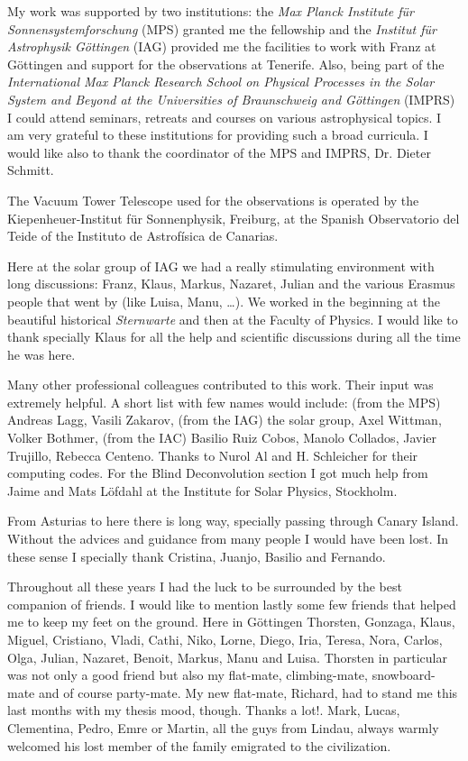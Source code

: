My work was supported by two institutions: the \emph{Max Planck Institute f\"ur Sonnensystemforschung} (MPS) granted me the fellowship and the \emph{Institut f\"ur Astrophysik G\"ottingen} (IAG) provided me the facilities to work with Franz at G\"ottingen and support for the observations at Tenerife. Also, being part of the \emph{International Max Planck Research School on Physical Processes in the Solar System and Beyond at the Universities of Braunschweig and G\"ottingen} (IMPRS) I could attend seminars, retreats and courses on various astrophysical topics. I am very grateful to these institutions for providing such a broad curricula. I would like also to thank the coordinator of the MPS and IMPRS, Dr. Dieter Schmitt. 

The Vacuum Tower Telescope used for the observations is operated by the Kiepenheuer-Institut f\"ur Sonnenphysik, Freiburg, at the Spanish Observatorio del Teide of the Instituto de Astrof\'isica de Canarias.  

Here at the solar group of IAG we had a really stimulating environment with long discussions: Franz, Klaus, Markus, Nazaret, Julian and the various Erasmus people that went by (like Luisa, Manu, \dots ). We worked in the beginning at the beautiful historical \emph{Sternwarte} and then at the Faculty of Physics. I would like to thank specially Klaus for all the help and scientific discussions during all the time he was here.

Many other professional colleagues contributed to this work. Their input was extremely helpful. A short list with few names would include: (from the MPS) Andreas Lagg, Vasili Zakarov, (from the IAG) the solar group, Axel Wittman, Volker Bothmer, (from the IAC) Basilio Ruiz Cobos, Manolo Collados, Javier Trujillo, Rebecca Centeno. Thanks to Nurol Al and H. Schleicher for their computing codes. For the Blind Deconvolution section I got much help from Jaime and Mats L\"ofdahl at the Institute for Solar Physics, Stockholm.

From Asturias to here there is long way, specially passing through Canary Island. Without the advices and guidance from many people I would have been lost. In these sense I specially thank Cristina, Juanjo, Basilio and Fernando. 

Throughout all these years I had the luck to be surrounded by the best companion of friends. I would like to mention lastly some few friends that helped me to keep my feet on the ground. Here in G\"ottingen Thorsten, Gonzaga, Klaus, Miguel, Cristiano, Vladi, Cathi, Niko, Lorne, Diego, Iria, Teresa, Nora, Carlos, Olga, Julian, Nazaret, Benoit, Markus, Manu and Luisa. Thorsten in particular was not only a good friend but also my flat-mate, climbing-mate, snowboard-mate and of course party-mate. My new flat-mate, Richard, had to stand me this last months with my thesis mood, though. Thanks a lot!.  Mark, Lucas, Clementina, Pedro, Emre or Martin, all the guys from Lindau, always warmly welcomed his lost member of the family emigrated to the civilization.

